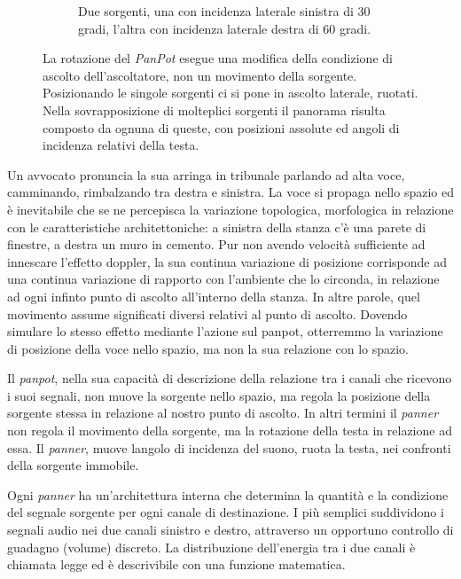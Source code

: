 \begin{figure}[t!]
\begin{subfigure}[t]{0.9\textwidth}
        \caption[]{Due sorgenti, una con incidenza laterale sinistra di 30 gradi,
        l'altra con incidenza laterale destra di 60 gradi.}
        \label{pan:both}
    \end{subfigure}
    \caption[]{La rotazione del \emph{PanPot} esegue una modifica della condizione
    di ascolto dell'ascoltatore, non un movimento della sorgente. Posizionando
    le singole sorgenti ci si pone in ascolto laterale, ruotati. Nella
    sovrapposizione di molteplici sorgenti il panorama risulta composto da
    ognuna di queste, con posizioni assolute ed angoli di incidenza relativi
    della testa.}
    \label{pan:all}
\end{figure}

Un avvocato pronuncia la sua arringa in tribunale parlando ad alta voce,
camminando, rimbalzando tra destra e sinistra. La voce si propaga nello spazio
ed è inevitabile che se ne percepisca la variazione topologica, morfologica in
relazione con le caratteristiche architettoniche: a sinistra della stanza c'è
una parete di finestre, a destra un muro in cemento. Pur non avendo velocità
sufficiente ad innescare l'effetto doppler, la sua continua variazione di
posizione corrisponde ad una continua variazione di rapporto con l'ambiente che
lo circonda, in relazione ad ogni infinto punto di ascolto all'interno della
stanza. In altre parole, quel movimento assume significati diversi relativi al
punto di ascolto. Dovendo simulare lo stesso effetto mediante l'azione sul panpot, otterremmo la
variazione di posizione della voce nello spazio, ma non la sua relazione con lo
spazio.



Il \emph{panpot}, nella sua capacità di descrizione della relazione tra i canali
che ricevono i suoi segnali, non muove la sorgente nello spazio, ma regola la
posizione della sorgente stessa in relazione al nostro punto di ascolto. In
altri termini il \emph{panner} non regola il movimento della sorgente, ma la
rotazione della testa in relazione ad essa. Il \emph{panner}, muove langolo di
incidenza del suono, ruota la testa, nei confronti della sorgente immobile.

Ogni \emph{panner} ha un'architettura interna che determina la quantità e la
condizione del segnale sorgente per ogni canale di destinazione. I più semplici
suddividono i segnali audio nei due canali sinistro e destro, attraverso un
opportuno controllo di guadagno (volume) discreto. La distribuzione dell'energia
tra i due canali è chiamata legge ed è descrivibile con una funzione matematica.

